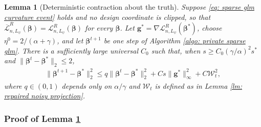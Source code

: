 \documentclass[letterpaper,12pt]{article}
\numberwithin{equation}{section}
\theoremstyle{plain}
\numberwithin{Theorem}{section}
\numberwithin{proposition}{section}
\newtheorem{Lemma}{Lemma}
\numberwithin{Lemma}{section}
{
	\theoremstyle{definition}
	\newtheorem{Definition}{Definition}
	\newtheorem{example}{Example}
	\numberwithin{example}{section}
	\newtheorem{fact}{Fact}
	\numberwithin{fact}{section}
	\newtheorem{remark}{Remark}
}
\newcommand{\1}{\mathbbm{1}}
\def\bbeta{{\boldsymbol{\beta}}}
\def\L{{\mathcal L}}
\begin{document}
\begin{Lemma}[Deterministic contraction about the truth]\label{lm: repaired noisy iht contraction}
Suppose \eqref{eq: sparse glm curvature event} holds and no design
coordinate is clipped, so that
\(\overline\L_{n,L_\psi}^R(\bbeta)=\L_{n,L_\psi}^R(\bbeta)\)
for every \(\bbeta\).
Let
$\bm g^*=\nabla\L_{n,L_\psi}^R(\bbeta^*)$, choose
$\eta^0=2/(\alpha+\gamma)$, and let $\bbeta^{t+1}$ be one step of Algorithm \ref{algo: private sparse glm}.  There is a sufficiently large universal $C_0$ such that, when
$s\geq C_0(\gamma/\alpha)^2s^*$ and
$\|\bbeta^t-\bbeta^*\|_2\leq2$,
\begin{align}
    \|\bbeta^{t+1}-\bbeta^*\|_2^2
    \leq q\|\bbeta^t-\bbeta^*\|_2^2
    +Cs\|\bm g^*\|_\infty^2+C\mathcal W_t^2,                \label{eq: repaired noisy iht recursion}
\end{align}
where $q\in(0,1)$ depends only on $\alpha/\gamma$ and
$\mathcal W_t$ is defined as in Lemma \ref{lm: repaired noisy projection}.
\end{Lemma}

\subsubsection{Proof of Lemma \ref{lm: repaired noisy iht contraction}}
\end{document}
